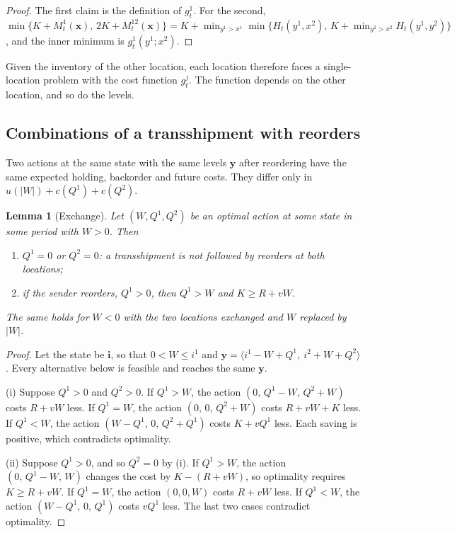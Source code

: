 \documentclass[11pt]{article}
\renewcommand{\vec}[1]{\boldsymbol{#1}}
\newtheorem{lemma}{Lemma}
\theoremstyle{definition}
\begin{document}
\begin{proof}
The first claim is the definition of $g^1_t$. For the second, $\min\{K+M^1_t(\vec{x}),\,2K+M^{12}_t(\vec{x})\}=K+\min_{y^1>x^1}\min\{H_t(y^1,x^2),\,K+\min_{y^2>x^2}H_t(y^1,y^2)\}$, and the inner minimum is $g^1_t(y^1;x^2)$.
\end{proof}

Given the inventory of the other location, each location therefore faces a single-location problem with the cost function $g^j_t$. The function depends on the other location, and so do the levels.

\subsection{Combinations of a transshipment with reorders}

Two actions at the same state with the same levels $\vec{y}$ after reordering have the same expected holding, backorder and future costs. They differ only in $u(|W|)+c(Q^1)+c(Q^2)$.

\begin{lemma}[Exchange]\label{lem:exchange}
Let $(W,Q^1,Q^2)$ be an optimal action at some state in some period with $W>0$. Then
\begin{enumerate}[label=(\roman*)]
\item $Q^1=0$ or $Q^2=0$: a transshipment is not followed by reorders at both locations;
\item if the sender reorders, $Q^1>0$, then $Q^1>W$ and $K\ge R+vW$.
\end{enumerate}
The same holds for $W<0$ with the two locations exchanged and $W$ replaced by $|W|$.
\end{lemma}

\begin{proof}
Let the state be $\vec{i}$, so that $0<W\le i^1$ and $\vec{y}=\langle i^1-W+Q^1,\ i^2+W+Q^2\rangle$. Every alternative below is feasible and reaches the same $\vec{y}$.

(i) Suppose $Q^1>0$ and $Q^2>0$. If $Q^1>W$, the action $(0,\,Q^1-W,\,Q^2+W)$ costs $R+vW$ less. If $Q^1=W$, the action $(0,\,0,\,Q^2+W)$ costs $R+vW+K$ less. If $Q^1<W$, the action $(W-Q^1,\,0,\,Q^2+Q^1)$ costs $K+vQ^1$ less. Each saving is positive, which contradicts optimality.

(ii) Suppose $Q^1>0$, and so $Q^2=0$ by (i). If $Q^1>W$, the action $(0,\,Q^1-W,\,W)$ changes the cost by $K-(R+vW)$, so optimality requires $K\ge R+vW$. If $Q^1=W$, the action $(0,0,W)$ costs $R+vW$ less. If $Q^1<W$, the action $(W-Q^1,\,0,\,Q^1)$ costs $vQ^1$ less. The last two cases contradict optimality.
\end{proof}
\end{document}
